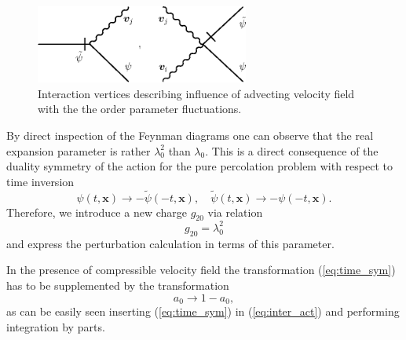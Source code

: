 \documentclass[aps,pre,url,twocolumn,superscriptaddress]{revtex4-1}
\def\mx{{\bm x}}
\begin{document}
\begin{figure}
   \includegraphics[width=7cm]{vertices2.eps}
   \caption{Interaction vertices describing influence of advecting velocity field
   with the the order parameter fluctuations.
   }
   \label{fig:vert2}
\end{figure}
By direct inspection of the Feynman diagrams one can 
observe that the real expansion parameter is 
rather $\lambda_0^2$ than $\lambda_0$. This is a direct consequence of the duality symmetry 
\cite{JanTau04}
of the action for the pure percolation problem with respect to time inversion
\begin{equation}
  \psi(t,\mx) \rightarrow -\tilde{\psi}(-t,\mx),\quad
  \tilde{\psi}(t,\mx) \rightarrow -\psi(-t,\mx).
  \label{eq:time_sym}
\end{equation}
Therefore, we introduce a
new charge $g_{20}$ via relation
\begin{equation}
  g_{20} = \lambda_0^2
  \label{eq:new_g2}
\end{equation}
and express the perturbation calculation in terms of this parameter.

In the presence of compressible velocity field the transformation
(\ref{eq:time_sym})
has to be supplemented by the transformation 
\begin{equation}
  a_0 \rightarrow 1-a_0,
  \label{eq:supple}
\end{equation}
as can be easily seen inserting (\ref{eq:time_sym}) in (\ref{eq:inter_act})
and performing integration by parts. 
\end{document}
